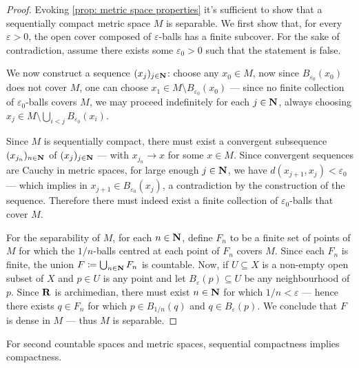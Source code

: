 \begin{proof}
Evoking \cref{prop: metric space properties} it's sufficient to show that a
sequentially compact metric space \(M\) is separable. We first show that, for
every \(\varepsilon > 0\), the open cover composed of \(\varepsilon\)-balls has
a finite subcover. For the sake of contradiction, assume there exists some
\(\varepsilon_0 > 0\) such that the statement is false.

We now construct a sequence \((x_j)_{j \in \mathbf{N}}\): choose any \(x_0 \in M\), now
since \(B_{\varepsilon_0}(x_0)\) does not cover \(M\), one can choose
\(x_1 \in M \setminus B_{\varepsilon_0}(x_0)\) --- since no finite collection of
\(\varepsilon_0\)-balls covers \(M\), we may proceed indefinitely for each
\(j \in \mathbf{N}\), always choosing
\(x_j \in M \setminus \bigcup_{i < j} B_{\varepsilon_0}(x_i)\).

Since \(M\) is sequentially compact, there must exist a convergent subsequence
\((x_{j_n})_{n \in \mathbf{N}}\) of \((x_j)_{j \in \mathbf{N}}\) --- with \(x_{j_n} \to x\) for
some \(x \in M\). Since convergent sequences are Cauchy in metric spaces,
for large enough \(j \in \mathbf{N}\), we have \(d(x_{j+1}, x_j) < \varepsilon_0\) ---
which implies in \(x_{j+1} \in B_{\varepsilon_0}(x_j)\), a contradiction by the
construction of the sequence. Therefore there must indeed exist a finite
collection of \(\varepsilon_0\)-balls that cover \(M\).

For the separability of \(M\), for each \(n \in \mathbf{N}\), define \(F_n\) to be a
finite set of points of \(M\) for which the \(1/n\)-balls centred at each point
of \(F_n\) covers \(M\). Since each \(F_n\) is finite, the union
\(F \coloneq \bigcup_{n \in \mathbf{N}} F_n\) is countable. Now, if \(U \subseteq X\) is
a non-empty open subset of \(X\) and \(p \in U\) is any point and let
\(B_{\varepsilon}(p) \subseteq U\) be any neighbourhood of \(p\). Since \(\mathbf{R}\)
is archimedian, there must exist \(n \in \mathbf{N}\) for which \(1/n < \varepsilon\)
--- hence there exists \(q \in F_n\) for which
\(p \in B_{1/n}(q)\) and \(q \in B_{\varepsilon}(p)\). We conclude that \(F\) is
dense in \(M\) --- thus \(M\) is separable.
\end{proof}

\begin{proposition}
\label{prop:metric-2nd-ctbl-seq-comp-implies-comp}
For second countable spaces and metric spaces, sequential compactness implies
compactness.
\end{proposition}

